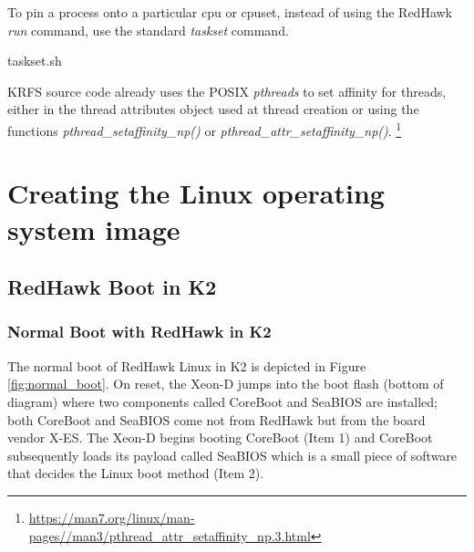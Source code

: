 \documentclass[12pt]{article}
\begin{document}
To pin a process onto a particular cpu or cpuset, instead of using the RedHawk
\emph{run} command, use the standard \emph{taskset} command.

\vspace{0.8cm}
\lstset{
    language=bash,
    basicstyle=\footnotesize\ttfamily,
    linewidth=6in,
    showstringspaces=false,
    keywordstyle=\ttfamily
}
\begin{adjustwidth}{0.0in}{0.0in}
\begin{lstinputlisting}[caption={Use taskset instead of run},
label={lst:taskset_cmd}]{taskset.sh}

\end{lstinputlisting}
\end{adjustwidth}
\vspace{0.8cm}

KRFS source code already uses the POSIX \emph{pthreads} to set affinity for
threads, either in the thread attributes object used at thread creation or using
the functions \emph{pthread\_setaffinity\_np()} or
\emph{pthread\_attr\_setaffinity\_np()}.%
\footnote{\url{https://man7.org/linux/man-pages//man3/pthread_attr_setaffinity_np.3.html}}


%
\newpage
\section{Creating the Linux operating system image}
\label{sec:image_creation}


\subsection{RedHawk Boot in K2}

\subsubsection{Normal Boot with RedHawk in K2}
The normal boot of RedHawk Linux in K2 is depicted in Figure \ref{fig:normal_boot}.
On reset, the Xeon-D jumps into the boot flash (bottom of diagram) where two
components called CoreBoot and SeaBIOS are installed; both CoreBoot and SeaBIOS
come not from RedHawk but from the board vendor X-ES.  The Xeon-D begins
booting CoreBoot (Item 1) and CoreBoot subsequently loads its payload called
SeaBIOS which is a small piece of software that decides the Linux boot method
(Item 2).
\end{document}
